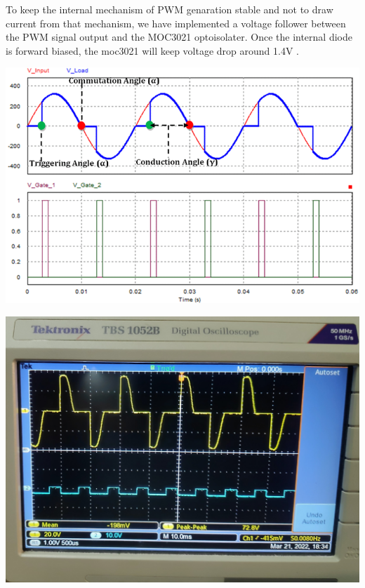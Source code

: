 \begin{multicols}{2}
To keep the internal mechanism of PWM genaration stable and not to draw current from that mechanism, we have implemented a voltage follower between the PWM signal output and the MOC3021 optoisolater. Once the internal diode is forward biased, the moc3021 will keep voltage drop around 1.4V .

\begin{minipage}{0.45\textwidth}
\centering
\includegraphics[width=\textwidth]{trig angle.png}
\end{minipage}

\begin{minipage}{0.45\textwidth}
\centering
\includegraphics[width=\textwidth]{Triac oc.jpg}
\end{minipage}


\end{multicols}
